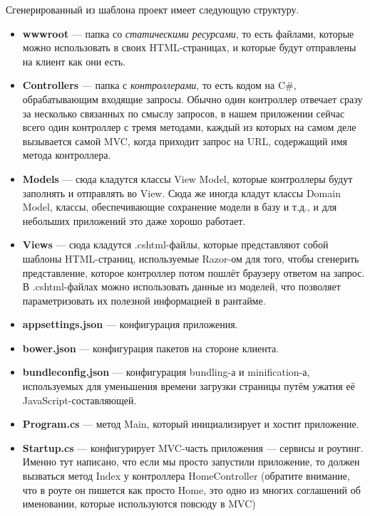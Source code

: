 \documentclass[a5paper]{article}
\begin{document}
Сгенерированный из шаблона проект имеет следующую структуру.
\begin{itemize}
	\item \textbf{wwwroot} --- папка со \textit{статическими ресурсами}, то есть файлами, которые можно использовать в своих HTML-страницах, и которые будут отправлены на клиент как они есть.
	\item \textbf{Controllers} --- папка с \textit{контроллерами}, то есть кодом на C\#, обрабатывающим входящие запросы. Обычно один контроллер отвечает сразу за несколько связанных по смыслу запросов,
		в нашем приложении сейчас всего один контроллер с тремя методами, каждый из которых на самом деле вызывается самой MVC, когда приходит запрос на URL, содержащий имя метода контроллера.
	\item \textbf{Models} --- сюда кладутся классы View Model, которые контроллеры будут заполнять и отправлять во View. Сюда же иногда кладут классы Domain Model, классы, обеспечивающие сохранение модели в базу и т.д., и для небольших приложений это даже хорошо работает.
	\item \textbf{Views} --- сюда кладутся .cshtml-файлы, которые представляют собой шаблоны HTML-страниц, используемые Razor-ом для того, чтобы сгенерить представление, которое контроллер потом пошлёт браузеру ответом на запрос. В .cshtml-файлах можно использовать
		данные из моделей, что позволяет параметризовать их полезной информацией в рантайме.
	\item \textbf{appsettings.json} --- конфигурация приложения.
	\item \textbf{bower.json} --- конфигурация пакетов на стороне клиента.
	\item \textbf{bundleconfig.json} --- конфигурация bundling-а и minification-а, используемых для уменьшения времени загрузки страницы путём ужатия её JavaScript-составляющей.
	\item \textbf{Program.cs} --- метод Main, который инициализирует и хостит приложение.
	\item \textbf{Startup.cs} --- конфигурирует MVC-часть приложения --- сервисы и роутинг. Именно тут написано, что если мы просто запустили приложение, то должен вызваться метод Index у контроллера HomeController (обратите внимание, что в роуте он пишется как просто Home, 
		это одно из многих соглашений об именовании, которые используются повсюду в MVC)
\end{itemize}
\end{document}
